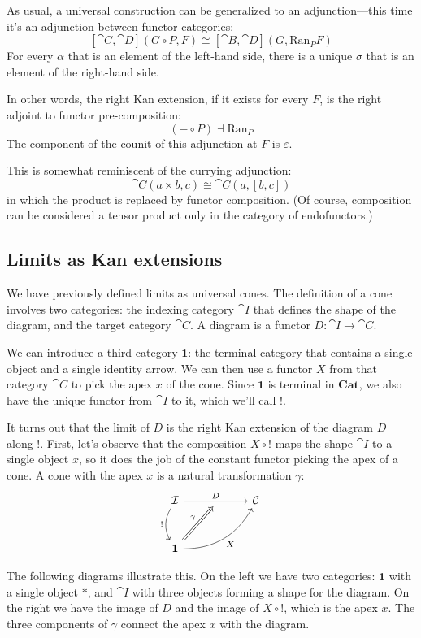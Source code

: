 \documentclass[DaoFP]{subfiles}
\begin{document}
As usual, a universal construction can be generalized to an adjunction---this time it's an adjunction between functor categories:
\[ [\cat C, \cat D](G \circ P, F) \cong [\cat B, \cat D](G, \text{Ran}_P F) \]
For every $\alpha$ that is an element of the left-hand side, there is a unique $\sigma$ that is an element of the right-hand side.

In other words, the right Kan extension, if it exists for every $F$, is the right adjoint to functor pre-composition:
\[ (- \circ P) \dashv \text{Ran}_P \]
The component of the counit of this adjunction at $F$ is $\varepsilon$.

This is somewhat reminiscent of the currying adjunction:
\[ \cat C (a \times b, c) \cong \cat C (a, [b, c]) \]
in which the product is replaced by functor composition. (Of course, composition can be considered a tensor product only in the category of endofunctors.)

\subsection{Limits as Kan extensions}
 We have previously defined limits as universal cones. The definition of a cone involves two categories: the indexing category $\cat I$ that defines the shape of the diagram, and the target category $\cat C$. A diagram is a functor $D \colon \cat I \to \cat C$. 
 
 We can introduce a third category $\mathbf 1$: the terminal category that contains a single object and a single identity arrow. We can then use a functor $X$ from that category $\cat C$ to pick the apex $x$ of the cone. Since $\mathbf 1$ is terminal in $\mathbf{Cat}$, we also have the unique functor from $\cat I$ to it, which we'll call $!$.
 
It turns out that the limit of $D$ is the right Kan extension of the diagram $D$ along $!$. First, let's observe that the composition $X \circ !$ maps the shape $\cat I$ to a single object $x$, so it does the job of the constant functor picking the apex of a cone. A cone with the apex $x$ is a natural transformation $\gamma$: 
\[
 \begin{tikzcd} [row sep=1cm, column sep=1cm]
 \cat I
 \arrow[rr, "D", "" {name=ID, below} ]
 \arrow[d, bend right, "!"']
 && \cat C
 \\
 \mathbf 1
  \arrow[urr, bend right, "X"']
 \arrow[Rightarrow, "\gamma",  to=ID]
 \end{tikzcd}
\]

The following diagrams illustrate this. On the left we have two categories: $\mathbf 1$ with a single object $*$, and $\cat I$ with three objects forming a shape for the diagram. On the right we have the image of $D$ and the image of $X \circ !$, which is the apex $x$. The three components of $\gamma$ connect the apex $x$ with the diagram. 
\end{document}
